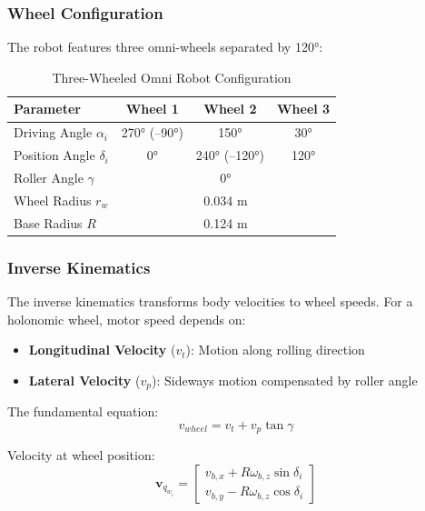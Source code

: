 \subsubsection{Wheel Configuration}

The robot features three omni-wheels separated by 120°:

\begin{table}[H]
\centering
\caption{Three-Wheeled Omni Robot Configuration}
\label{tab:wheel_config}
\begin{tabular}{|l|c|c|c|}
\hline
\textbf{Parameter} & \textbf{Wheel 1} & \textbf{Wheel 2} & \textbf{Wheel 3} \\
\hline
Driving Angle $\alpha_i$ & 270° (--90°) & 150° & 30° \\
\hline
Position Angle $\delta_i$ & 0° & 240° (--120°) & 120° \\
\hline
Roller Angle $\gamma$ & \multicolumn{3}{c|}{0°} \\
\hline
Wheel Radius $r_w$ & \multicolumn{3}{c|}{0.034 m} \\
\hline
Base Radius $R$ & \multicolumn{3}{c|}{0.124 m} \\
\hline
\end{tabular}
\end{table}

\subsubsection{Inverse Kinematics}

The inverse kinematics transforms body velocities to wheel speeds. For a holonomic wheel, motor speed depends on:
\begin{itemize}
    \item \textbf{Longitudinal Velocity} ($v_t$): Motion along rolling direction
    \item \textbf{Lateral Velocity} ($v_p$): Sideways motion compensated by roller angle
\end{itemize}

The fundamental equation:
\begin{equation}
v_{wheel} = v_t + v_p \tan\gamma
\label{eq:wheel_fundamental}
\end{equation}

Velocity at wheel position:
\begin{equation}
\mathbf{v}_{q_{w_i}} = \begin{bmatrix} v_{b,x} + R\omega_{b,z}\sin\delta_i \\ v_{b,y} - R\omega_{b,z}\cos\delta_i \end{bmatrix}
\label{eq:wheel_pos_vel}
\end{equation}

